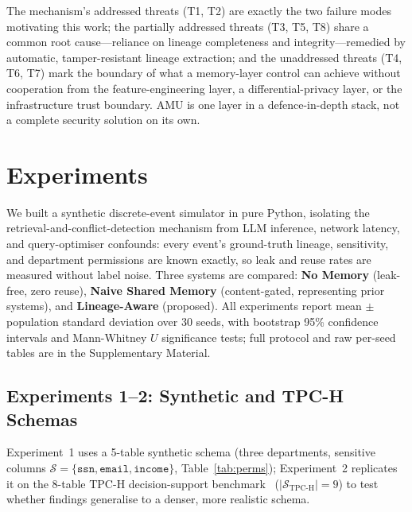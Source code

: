 \documentclass[nolineno]{ieeeaccess}
\begin{document}
The mechanism's addressed threats (T1, T2) are exactly the two failure modes
motivating this work; the partially addressed threats (T3, T5, T8) share a
common root cause---reliance on lineage completeness and
integrity---remedied by automatic, tamper-resistant lineage extraction; and
the unaddressed threats (T4, T6, T7) mark the boundary of what a
memory-layer control can achieve without cooperation from the
feature-engineering layer, a differential-privacy layer, or the
infrastructure trust boundary.
AMU is one layer in a defence-in-depth stack, not a complete security
solution on its own.

\section{Experiments}
\label{sec:experiments}

We built a synthetic discrete-event simulator in pure Python, isolating the
retrieval-and-conflict-detection mechanism from LLM inference, network
latency, and query-optimiser confounds: every event's ground-truth lineage,
sensitivity, and department permissions are known exactly, so leak and reuse
rates are measured without label noise.
Three systems are compared: \textbf{No Memory} (leak-free, zero reuse),
\textbf{Naive Shared Memory} (content-gated, representing prior systems),
and \textbf{Lineage-Aware} (proposed).
All experiments report mean $\pm$ population standard deviation over 30
seeds, with bootstrap 95\% confidence intervals and Mann-Whitney $U$
significance tests; full protocol and raw per-seed tables are in the
Supplementary Material.

\subsection{Experiments 1--2: Synthetic and TPC-H Schemas}
\label{sec:exp1}
\label{sec:exp2}

Experiment~1 uses a 5-table synthetic schema (three departments, sensitive
columns $\mathcal{S}=\{\texttt{ssn},\texttt{email},\texttt{income}\}$, Table~\ref{tab:perms});
Experiment~2 replicates it on the 8-table TPC-H decision-support
benchmark~\cite{tpch2021} ($|\mathcal{S}_{\text{TPC-H}}|=9$) to test whether
findings generalise to a denser, more realistic schema.
\end{document}
